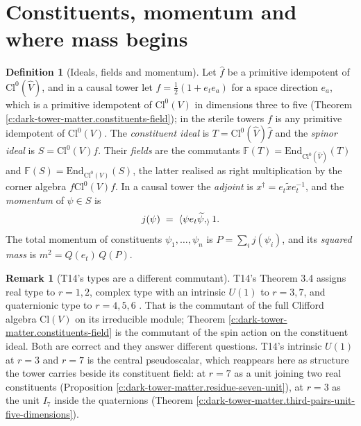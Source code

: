 \documentclass[11pt]{article}
\theoremstyle{definition}
\newtheorem{definition}[theorem]{Definition}
\newtheorem{remark}[theorem]{Remark}
\theoremstyle{plain}
\providecommand{\Cl}{}\renewcommand{\Cl}{\mathrm{Cl}}
\providecommand{\F}{}\renewcommand{\F}{\mathbb{F}}
\providecommand{\hatV}{}\renewcommand{\hatV}{\widehat{V}}
\providecommand{\hf}{}\renewcommand{\hf}{\hat{f}}
\providecommand{\ip}{}\renewcommand{\ip}[2]{\langle #1, #2\rangle}
\providecommand{\rev}{}\renewcommand{\rev}[1]{\widetilde{#1}}
\begin{document}
\section{Constituents, momentum and where mass begins}

\begin{definition}[Ideals, fields and momentum]\label{c:obj.dark-tower-matter.ideals-fields-momentum}
Let $\hf$ be a primitive idempotent of $\Cl^{0}(\hatV)$, and in a causal tower let $f = \tfrac{1}{2}(1 + e_{t}e_{a})$ for a space direction $e_{a}$, which is a primitive idempotent of $\Cl^{0}(V)$ in dimensions three to five (Theorem \ref{c:dark-tower-matter.constituents-field}); in the sterile towers $f$ is any primitive idempotent of $\Cl^{0}(V)$. The \emph{constituent ideal} is $T = \Cl^{0}(\hatV)\hf$ and the \emph{spinor ideal} is $S = \Cl^{0}(V)f$. Their \emph{fields} are the commutants $\F(T) = \mathrm{End}_{\Cl^{0}(\hatV)}(T)$ and $\F(S) = \mathrm{End}_{\Cl^{0}(V)}(S)$, the latter realised as right multiplication by the corner algebra $f\Cl^{0}(V)f$. In a causal tower the \emph{adjoint} is $x^{\dagger} = e_{t}\rev{x}e_{t}^{-1}$, and the \emph{momentum} of $\psi \in S$ is
\[
j(\psi) \;=\; \ip{\psi e_{t} \rev{\psi}}_{1}.
\]
The total momentum of constituents $\psi_{1}, \ldots, \psi_{n}$ is $P = \sum_{i} j(\psi_{i})$, and its \emph{squared mass} is $m^{2} = Q(e_{t})\,Q(P)$.
\end{definition}

\begin{remark}[T14's types are a different commutant]\label{c:note.dark-tower-matter.t14s-types-are-different-commutant}
T14's Theorem 3.4 assigns real type to $r = 1, 2$, complex type with an intrinsic $U(1)$ to $r = 3, 7$, and quaternionic type to $r = 4, 5, 6$ \cite[Thm.~3.4]{ButlerT14}. That is the commutant of the full Clifford algebra $\Cl(V)$ on its irreducible module; Theorem \ref{c:dark-tower-matter.constituents-field} is the commutant of the spin action on the constituent ideal. Both are correct and they answer different questions. T14's intrinsic $U(1)$ at $r = 3$ and $r = 7$ is the central pseudoscalar, which reappears here as structure the tower carries beside its constituent field: at $r = 7$ as a unit joining two real constituents (Proposition \ref{c:dark-tower-matter.residue-seven-unit}), at $r = 3$ as the unit $I_{7}$ inside the quaternions (Theorem \ref{c:dark-tower-matter.third-pairs-unit-five-dimensions}).
\end{remark}
\end{document}
